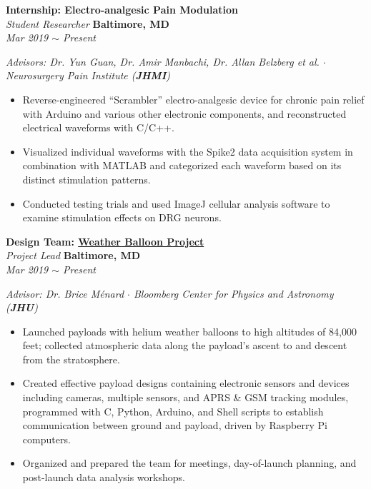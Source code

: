 \documentclass[10pt, letterpaper]{article}
\begin{document}
\begin{paracol}{2}
	\textbf{Internship: Electro-analgesic Pain Modulation}\\
	\textit{Student Researcher}
	\switchcolumn \hfill
	\raggedleft\textbf{Baltimore, MD}\\
	\raggedleft\textit{Mar 2019 $\sim$ Present}
\end{paracol}\vspace{-1mm}
\textit{Advisors: Dr. Yun Guan, Dr. Amir Manbachi, Dr. Allan Belzberg et al. $\cdot$ Neurosurgery
Pain Institute (\textbf{JHMI})}
\vspace{-3mm}
\begin{itemize}
	\item Reverse-engineered ``Scrambler'' electro-analgesic device for chronic pain relief with 
	Arduino and various other electronic components, and reconstructed electrical waveforms 
	with C/C++.
	\vspace{-3mm}
	\item Visualized individual waveforms with the Spike2 data acquisition system in combination 
	with MATLAB and categorized each waveform based on its distinct stimulation patterns.
	\vspace{-3mm}
	\item Conducted testing trials and used ImageJ cellular analysis software to examine stimulation effects on DRG neurons.
\end{itemize}
\vspace{-2mm} 

\pagebreak

\begin{paracol}{2}
	\textbf{Design Team: \href{https://nearspace.jhu.edu/}{Weather Balloon Project}}\\
	\textit{Project Lead}
	\switchcolumn
	\raggedleft\textbf{Baltimore, MD}\\
	\raggedleft\textit{Mar 2019 $\sim$ Present}
\end{paracol}\vspace{-1mm}
\textit{Advisor: Dr. Brice Ménard $\cdot$ Bloomberg Center for Physics and Astronomy (\textbf{JHU})}
\vspace{-2mm}
\begin{itemize}
	\item  Launched payloads with helium weather balloons to high altitudes of 84,000
	feet; collected atmospheric data along the payload's ascent to and descent from the 
	stratosphere.\vspace{-3mm}
	\item Created effective payload designs containing electronic sensors and devices including
	cameras, multiple sensors, and APRS \& GSM tracking modules, programmed with C, Python, 
	Arduino, and Shell scripts to establish communication between ground and payload,
	driven by Raspberry Pi computers.\vspace{-3mm}
	\item Organized and prepared the team for meetings, day-of-launch planning,
	and post-launch data analysis workshops.
\end{itemize}
\vspace{-2mm}
\end{document}
